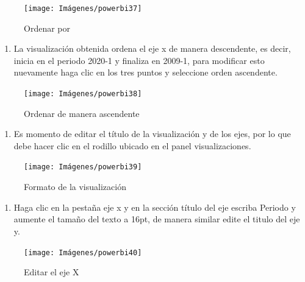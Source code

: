 \documentclass[
]{book}
\providecommand{\tightlist}{%
  \setlength{\itemsep}{0pt}\setlength{\parskip}{0pt}}
\begin{document}
\begin{figure}

{\centering \texttt{[image: Imágenes/powerbi37]} 

}

\caption{Ordenar por}\label{fig:paso5lineaspowerbi-fig}
\end{figure}

\begin{enumerate}
\def\labelenumi{\arabic{enumi}.}
\setcounter{enumi}{5}
\tightlist
\item
  La visualización obtenida ordena el eje x de manera descendente, es decir, inicia en el periodo 2020-1 y finaliza en 2009-1, para modificar esto nuevamente haga clic en los tres puntos y seleccione orden ascendente.
\end{enumerate}

\begin{figure}

{\centering \texttt{[image: Imágenes/powerbi38]} 

}

\caption{Ordenar de manera ascendente}\label{fig:paso6lineaspowerbi-fig}
\end{figure}

\begin{enumerate}
\def\labelenumi{\arabic{enumi}.}
\setcounter{enumi}{6}
\tightlist
\item
  Es momento de editar el título de la visualización y de los ejes, por lo que debe hacer clic en el rodillo ubicado en el panel visualizaciones.
\end{enumerate}

\begin{figure}

{\centering \texttt{[image: Imágenes/powerbi39]} 

}

\caption{Formato de la visualización}\label{fig:paso7lineaspowerbi-fig}
\end{figure}

\begin{enumerate}
\def\labelenumi{\arabic{enumi}.}
\setcounter{enumi}{7}
\tightlist
\item
  Haga clic en la pestaña eje x y en la sección título del eje escriba Periodo y aumente el tamaño del texto a 16pt, de manera similar edite el titulo del eje y.
\end{enumerate}

\begin{figure}

{\centering \texttt{[image: Imágenes/powerbi40]} 

}

\caption{Editar el eje X}\label{fig:paso8lineaspowerbi-fig}
\end{figure}
\end{document}
